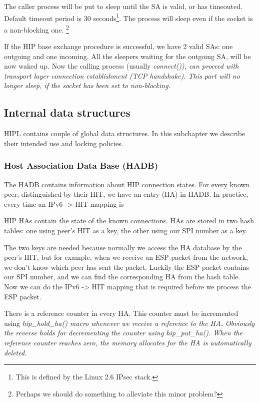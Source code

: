 The caller process will be put to sleep until the SA is valid, or has timeouted.
Default timeout period is 30 seconds\footnote{This is defined by the Linux 2.6 
 IPsec stack.}. The process will sleep even if the socket is a non-blocking one.
\footnote{Perhaps we should do something to alleviate this minor problem?}

If the HIP base exchange procedure is successful, we have 2 valid SAs: one
outgoing and one incoming. All the sleepers waiting for the outgoing SA, will be
now waked up. Now the calling process (usually \em{connect()}), can proceed with
transport layer connection establishment (TCP handshake). This part will no
longer sleep, if the socket has been set to non-blocking.


\subsection{Internal data structures}

HIPL contains couple of global data structures. In this subchapter we describe
their intended use and locking policies.

\subsubsection{Host Association Data Base (HADB)}

The HADB contains information about HIP connection states. For every known peer,
distinguished by their HIT, we have an entry (HA) in HADB. In practice, every
time an IPv6 -> HIT mapping is

HIP HAs contain the state of the known connections. HAs are stored in two hash
tables: one using peer's HIT as a key, the other using our SPI number as a key.

The two keys are needed because normally we access the HA database by the peer's
HIT, but for example, when we receive an ESP packet from the network, we don't
know which peer has sent the packet. Luckily the ESP packet contains our SPI
number, and we can find the corresponding HA from the hash table. Now we can do
the IPv6 -> HIT mapping that is required before we process the ESP packet.

There is a reference counter in every HA. This counter must be incremented using
\em{hip\_hold\_ha()} macro whenever we receive a reference to the HA. Obviously
the reverse holds for decrementing the counter using \em{hip\_put\_ha()}. When the
reference counter reaches zero, the memory allocates for the HA is automatically
deleted.

